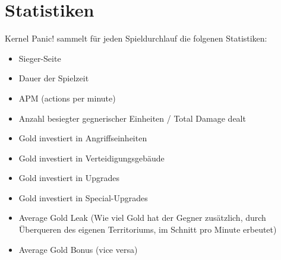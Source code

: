 \section{Statistiken}

%
%

Kernel Panic! sammelt für jeden Spieldurchlauf die folgenen Statistiken:
\begin{itemize}
	\item Sieger-Seite
	\item Dauer der Spielzeit
	\item APM (actions per minute)
	\item Anzahl besiegter gegnerischer Einheiten / Total Damage dealt
	\item Gold investiert in Angriffseinheiten
	\item Gold investiert in Verteidigungsgebäude
	\item Gold investiert in Upgrades
	\item Gold investiert in Special-Upgrades
	\item Average Gold Leak (Wie viel Gold hat der Gegner zusätzlich, durch Überqueren des eigenen Territoriums, im Schnitt pro Minute erbeutet)
	\item Average Gold Bonus (vice versa)
\end{itemize}

